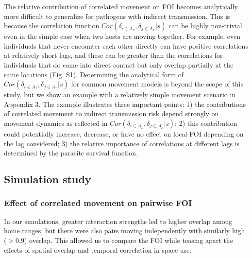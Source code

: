 \documentclass[letterpaper]{article}
\begin{document}
The relative contribution of correlated movement on FOI becomes analytically more difficult to generalize for pathogens with indirect transmission. This is because the correlation function $Cor(\delta_{i \in A_x}, \delta_{j \in A_x} | s)$ can be highly non-trivial even in the simple case when two hosts are moving together. For example, even individuals that never encounter each other directly can have positive correlations at relatively short lags, and these can be greater than the correlations for individuals that do come into direct contact but only overlap partially at the same locations (Fig. S1). Determining the analytical form of $Cor(\delta_{i \in A_x}, \delta_{j \in A_x} | s)$ for common movement models is beyond the scope of this study, but we show an example with a relatively simple movement scenario in Appendix 3. The example illustrates three important points: 1) the contributions of correlated movement to indirect transmission risk depend strongly on movement dynamics as reflected in $Cor(\delta_{i \in A_x}, \delta_{j \in A_x} | s)$; 2) this contribution could potentially increase, decrease, or have no effect on local FOI depending on the lag considered; 3) the relative importance of correlations at different lags is determined by the parasite survival function.

\subsection*{Simulation study}

\subsubsection*{Effect of correlated movement on pairwise FOI}

In our simulations, greater interaction strengths led to higher overlap among home ranges, but there were also pairs moving independently with similarly high  ($>$0.9) overlap. %
This allowed us to compare the FOI while teasing apart the effects of spatial overlap and temporal correlation in space use. 
\end{document}
